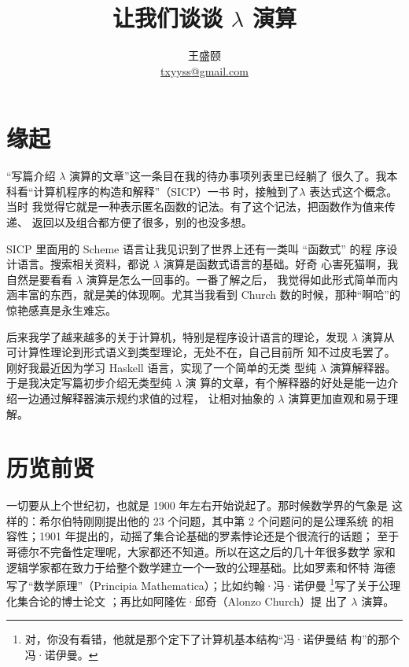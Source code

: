 \documentclass[a4paper,adobefonts]{ctexart}
\theoremstyle{definition}
\begin{document}
\title{{\bfseries 让我们谈谈 $\lambda$ 演算}}
\author{王盛颐\\\href{mailto:txyyss@gmail.com}{txyyss@gmail.com}}
\date{}
\maketitle

\section*{缘起}

``写篇介绍 $\lambda$ 演算的文章''这一条目在我的待办事项列表里已经躺了
很久了。我本科看``计算机程序的构造和解释''（SICP）一书
\cite{abelson1996structure}时，接触到了$\lambda$ 表达式这个概念。当时
我觉得它就是一种表示匿名函数的记法。有了这个记法，把函数作为值来传递、
返回以及组合都方便了很多，别的也没多想。

SICP 里面用的 Scheme 语言让我见识到了世界上还有一类叫 ``函数式'' 的程
序设计语言。搜索相关资料，都说 $\lambda$ 演算是函数式语言的基础。好奇
心害死猫啊，我自然是要看看 $\lambda$ 演算是怎么一回事的。一番了解之后，
我觉得如此形式简单而内涵丰富的东西，就是美的体现啊。尤其当我看到
Church 数的时候，那种``啊哈''的惊艳感真是永生难忘。

后来我学了越来越多的关于计算机，特别是程序设计语言的理论，发现
$\lambda$ 演算从可计算性理论到形式语义到类型理论，无处不在，自己目前所
知不过皮毛罢了。刚好我最近因为学习 Haskell 语言，实现了一个简单的无类
型纯 $\lambda$ 演算解释器。于是我决定写篇初步介绍无类型纯 $\lambda$ 演
算的文章，有个解释器的好处是能一边介绍一边通过解释器演示规约求值的过程，
让相对抽象的 $\lambda$ 演算更加直观和易于理解。

\section{历览前贤}

一切要从上个世纪初，也就是 1900 年左右开始说起了。那时候数学界的气象是
这样的：希尔伯特刚刚提出他的 23 个问题，其中第 2 个问题问的是公理系统
的相容性；1901 年提出的，动摇了集合论基础的罗素悖论还是个很流行的话题；
至于哥德尔不完备性定理呢，大家都还不知道。所以在这之后的几十年很多数学
家和逻辑学家都在致力于给整个数学建立一个一致的公理基础。比如罗素和怀特
海德写了``数学原理''（Principia
  Mathematica\cite{whitehead1927principia}）；比如约翰·冯·诺伊曼
\footnote{对，你没有看错，他就是那个定下了计算机基本结构``冯·诺伊曼结
  构''的那个冯·诺伊曼。}写了关于公理化集合论的博士论文
\cite{GlossarWiki:Neumann:1925}；再比如阿隆佐·邱奇（Alonzo Church）提
出了 $\lambda$ 演算\cite{church1932set}。
\end{document}
